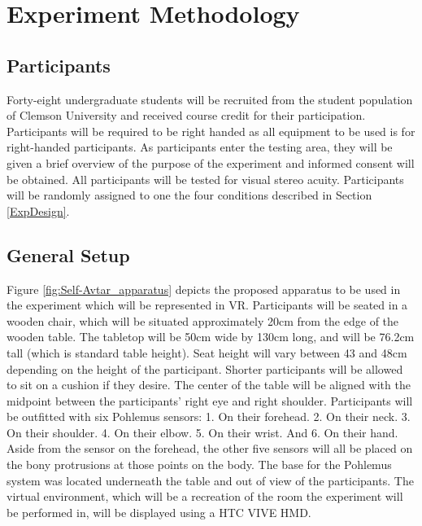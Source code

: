 
\section{Experiment Methodology}

\subsection{Participants}
Forty-eight undergraduate students will be recruited from the student population of Clemson University and received course credit for their participation. Participants will be required to be right handed as all equipment to be used is for right-handed participants. As participants enter the testing area, they will be given a brief overview of the purpose of the experiment and informed consent will be obtained. All participants will be tested for visual stereo acuity. Participants will be randomly assigned to one the four conditions described in Section \ref{ExpDesign}. 

\subsection{General Setup}
Figure \ref{fig:Self-Avtar_apparatus} depicts the proposed apparatus to be used in the experiment which will be represented in VR. Participants will be seated in a wooden chair, which will be situated approximately 20cm from the edge of the wooden table. The tabletop will be 50cm wide by 130cm long, and will be 76.2cm tall (which is standard table height). Seat height will vary between 43 and 48cm depending on the height of the participant. Shorter participants will be allowed to sit on a cushion if they desire. The center of the table will be aligned with the midpoint between the participants’ right eye and right shoulder. Participants will be outfitted with six Pohlemus sensors: 1. On their forehead. 2. On their neck. 3. On their shoulder. 4. On their elbow. 5. On their wrist. And 6. On their hand. Aside from the sensor on the forehead, the other five sensors will all be placed on the bony protrusions at those points on the body. The base for the Pohlemus system was located underneath the table and out of view of the participants. The virtual environment, which will be a recreation of the room the experiment will be performed in, will be displayed using a HTC VIVE HMD.

